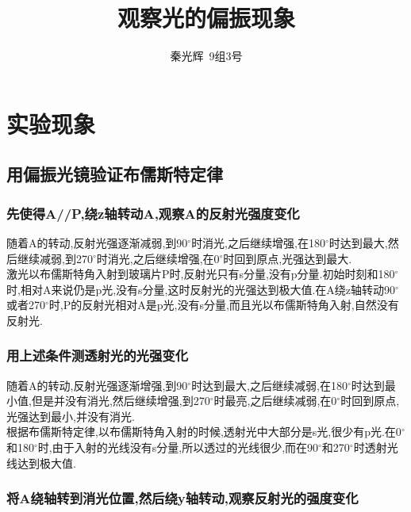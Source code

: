 \documentclass[a4paper,10pt,notitlepage]{article}
\begin{document}
\title{观察光的偏振现象}
\author{秦光辉\ 9组3号}
\maketitle

\section{实验现象}

\subsection{用偏振光镜验证布儒斯特定律}

\subsubsection{先使得A//P,绕z轴转动A,观察A的反射光强度变化}

	随着A的转动,反射光强逐渐减弱,到90$^{\circ}$时消光,之后继续增强,在180$^{\circ}$时达到最大,然后继续减弱,到270$^{\circ}$时消光,之后继续增强,在0$^{\circ}$时回到原点,光强达到最大. \\
	
	激光以布儒斯特角入射到玻璃片P时,反射光只有s分量,没有p分量.初始时刻和180$^{\circ}$时,相对A来说仍是p光,没有s分量,这时反射光的光强达到极大值.在A绕z轴转动90$^{\circ}$或者270$^{\circ}$时,P的反射光相对A是p光,没有s分量,而且光以布儒斯特角入射,自然没有反射光. \\
	
\subsubsection{用上述条件测透射光的光强变化}

	随着A的转动,反射光强逐渐增强,到90$^{\circ}$时达到最大,之后继续减弱,在180$^{\circ}$时达到最小值,但是并没有消光,然后继续增强,到270$^{\circ}$时最亮,之后继续减弱,在0$^{\circ}$时回到原点,光强达到最小,并没有消光. \\
	
	根据布儒斯特定律,以布儒斯特角入射的时候,透射光中大部分是s光,很少有p光.在0$^{\circ}$和180$^{\circ}$时,由于入射的光线没有s分量,所以透过的光线很少,而在90$^{\circ}$和270$^{\circ}$时透射光线达到极大值. \\
	
\subsubsection{将A绕轴转到消光位置,然后绕y轴转动,观察反射光的强度变化}
\end{document}
